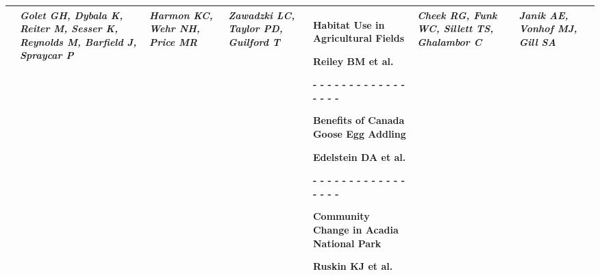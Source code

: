 \begin{tabular}{|x{0.8cm}|x{2.65cm}|x{2.65cm}|x{2.65cm}|y{2.65cm}|x{2.65cm}|x{2.65cm}|@{}m{0pt}@{}}
\hline
{}& \par \vspace{8pt} \textit{Golet GH, Dybala K, Reiter M, Sesser K, Reynolds M, Barfield J, Spraycar P} &  \par \vspace{8pt} \textit{Harmon KC, Wehr NH, Price MR} &  \par \vspace{8pt} \textit{Zawadzki LC, Taylor PD, Guilford T} & \scriptsize Habitat Use in Agricultural Fields\par \tiny Reiley BM et al.\par - - - - - - - - - - - - - - - - - \par \vspace{2pt} \scriptsize Benefits of Canada Goose Egg Addling\par \tiny Edelstein DA et al.\par - - - - - - - - - - - - - - - - - \par \vspace{2pt} \scriptsize Community Change in Acadia National Park\par \tiny Ruskin KJ et al. &  \par \vspace{8pt} \textit{Cheek RG, Funk WC, Sillett TS, Ghalambor C} &  \par \vspace{8pt} \textit{Janik AE, Vonhof MJ, Gill SA}&\\[25ex]
\hline

\end{tabular}
